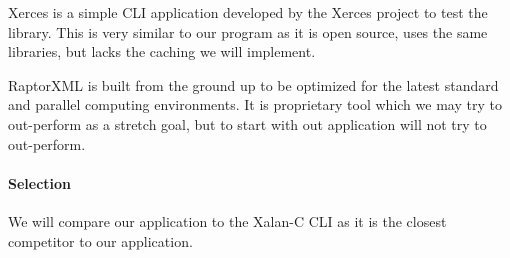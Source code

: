 Xerces is a simple CLI application developed by the Xerces project to test the library.
This is very similar to our program as it is open source, uses the same libraries, but lacks the caching we will implement.

RaptorXML is built from the ground up to be optimized for the latest standard and parallel computing environments.
It is proprietary tool which we may try to out-perform as a stretch goal, but to start with out application will not try to out-perform.

\paragraph{Selection}

We will compare our application to the Xalan-C CLI as it is the closest competitor to our application.
